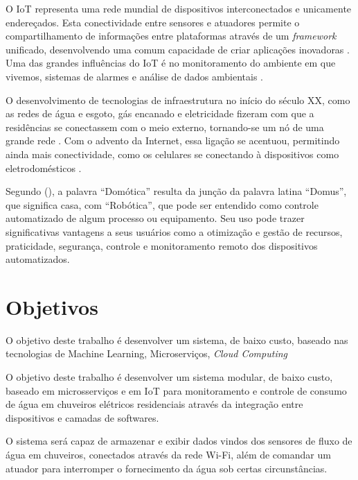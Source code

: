 O IoT representa uma rede mundial de dispositivos interconectados e unicamente endereçados. Esta conectividade entre sensores e atuadores permite o compartilhamento de informações entre plataformas através de um \textit{framework} unificado, desenvolvendo uma comum capacidade de criar aplicações inovadoras  \cite{RisteskaStojkoska2017}. Uma das grandes influências do IoT é no monitoramento do ambiente em que vivemos, sistemas de alarmes e análise de dados ambientais \cite{Perumal2016}. %

O desenvolvimento de tecnologias de infraestrutura no início do século XX, como as redes de água e esgoto, gás encanado e eletricidade fizeram com que a residências se conectassem com o meio externo, tornando-se um nó de uma grande rede \cite{forty2007objetos}. Com o advento da Internet, essa ligação se acentuou, permitindo ainda mais conectividade, como os celulares se conectando à dispositivos como eletrodomésticos \cite{VarelaDeSouza}.

Segundo \citeauthor{VarelaDeSouza} (\citeyear{VarelaDeSouza}), a palavra “Domótica” resulta da junção da palavra latina
“Domus”, que significa casa, com “Robótica”, que pode ser entendido como controle automatizado de algum processo ou equipamento. Seu uso pode trazer significativas vantagens a seus usuários como a otimização e gestão de recursos, praticidade, segurança, controle e monitoramento remoto dos dispositivos automatizados.



\section{Objetivos} 

O objetivo deste trabalho é desenvolver um sistema, de baixo custo, baseado nas tecnologias de Machine Learning, Microserviços, \textit{Cloud Computing}

O objetivo deste trabalho é desenvolver um sistema modular, de baixo custo, baseado em microsserviços e em IoT para monitoramento e controle de consumo de água em chuveiros elétricos residenciais através da integração entre dispositivos e camadas de softwares. 

O sistema será capaz de armazenar e exibir dados vindos dos sensores de fluxo de água em chuveiros, conectados através da rede Wi-Fi, além de comandar um atuador para interromper o fornecimento da água sob certas circunstâncias.

